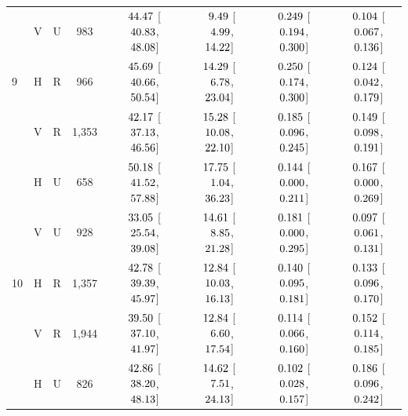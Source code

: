 \begin{landscape}
\begin{longtable}{lccccccc}
 & V & U & 983 & $\hphantom{-}44.47$ [$\hphantom{-}40.83$, $\hphantom{-}48.08$] & $\hphantom{-}\hphantom{0}9.49$ [$\hphantom{-}\hphantom{0}4.99$, $\hphantom{-}14.22$] & $\hphantom{-}0.249$ [$\hphantom{-}0.194$, $\hphantom{-}0.300$] & $\hphantom{-}0.104$ [$\hphantom{-}0.067$, $\hphantom{-}0.136$] \\
9 & H & R & 966 & $\hphantom{-}45.69$ [$\hphantom{-}40.66$, $\hphantom{-}50.54$] & $\hphantom{-}14.29$ [$\hphantom{-}\hphantom{0}6.78$, $\hphantom{-}23.04$] & $\hphantom{-}0.250$ [$\hphantom{-}0.174$, $\hphantom{-}0.300$] & $\hphantom{-}0.124$ [$\hphantom{-}0.042$, $\hphantom{-}0.179$] \\
 & V & R & 1,353 & $\hphantom{-}42.17$ [$\hphantom{-}37.13$, $\hphantom{-}46.56$] & $\hphantom{-}15.28$ [$\hphantom{-}10.08$, $\hphantom{-}22.10$] & $\hphantom{-}0.185$ [$\hphantom{-}0.096$, $\hphantom{-}0.245$] & $\hphantom{-}0.149$ [$\hphantom{-}0.098$, $\hphantom{-}0.191$] \\
 & H & U & 658 & $\hphantom{-}50.18$ [$\hphantom{-}41.52$, $\hphantom{-}57.88$] & $\hphantom{-}17.75$ [$\hphantom{-}\hphantom{0}1.04$, $\hphantom{-}36.23$] & $\hphantom{-}0.144$ [$\hphantom{-}0.000$, $\hphantom{-}0.211$] & $\hphantom{-}0.167$ [$\hphantom{-}0.000$, $\hphantom{-}0.269$] \\
 & V & U & 928 & $\hphantom{-}33.05$ [$\hphantom{-}25.54$, $\hphantom{-}39.08$] & $\hphantom{-}14.61$ [$\hphantom{-}\hphantom{0}8.85$, $\hphantom{-}21.28$] & $\hphantom{-}0.181$ [$\hphantom{-}0.000$, $\hphantom{-}0.295$] & $\hphantom{-}0.097$ [$\hphantom{-}0.061$, $\hphantom{-}0.131$] \\
10 & H & R & 1,357 & $\hphantom{-}42.78$ [$\hphantom{-}39.39$, $\hphantom{-}45.97$] & $\hphantom{-}12.84$ [$\hphantom{-}10.03$, $\hphantom{-}16.13$] & $\hphantom{-}0.140$ [$\hphantom{-}0.095$, $\hphantom{-}0.181$] & $\hphantom{-}0.133$ [$\hphantom{-}0.096$, $\hphantom{-}0.170$] \\
 & V & R & 1,944 & $\hphantom{-}39.50$ [$\hphantom{-}37.10$, $\hphantom{-}41.97$] & $\hphantom{-}12.84$ [$\hphantom{-}\hphantom{0}6.60$, $\hphantom{-}17.54$] & $\hphantom{-}0.114$ [$\hphantom{-}0.066$, $\hphantom{-}0.160$] & $\hphantom{-}0.152$ [$\hphantom{-}0.114$, $\hphantom{-}0.185$] \\
 & H & U & 826 & $\hphantom{-}42.86$ [$\hphantom{-}38.20$, $\hphantom{-}48.13$] & $\hphantom{-}14.62$ [$\hphantom{-}\hphantom{0}7.51$, $\hphantom{-}24.13$] & $\hphantom{-}0.102$ [$\hphantom{-}0.028$, $\hphantom{-}0.157$] & $\hphantom{-}0.186$ [$\hphantom{-}0.096$, $\hphantom{-}0.242$] \\

\end{longtable}
\end{landscape}
